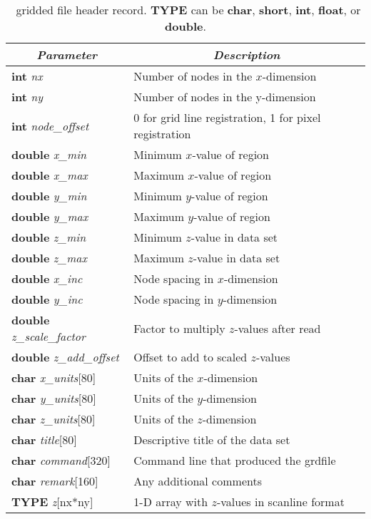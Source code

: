 \begin{table}
\centering
\begin{tabular}{|l|l|} \hline
\multicolumn{1}{|c}{\emph{Parameter}}   &       \multicolumn{1}{|c|}{\emph{Description}}        \\ \hline
\textbf{int} \emph{nx}                      &       Number of nodes in the $x$-dimension    \\ \hline
\textbf{int} \emph{ny}                      &       Number of nodes in the y-dimension      \\ \hline
\textbf{int} \emph{node\_offset}    &       0 for grid line registration, 1 for pixel registration  \\ \hline
\textbf{double} \emph{x\_min}               &       Minimum $x$-value of region     \\ \hline
\textbf{double} \emph{x\_max}               &       Maximum $x$-value of region  \\ \hline
\textbf{double} \emph{y\_min}               &       Minimum $y$-value of region  \\ \hline
\textbf{double} \emph{y\_max}               &       Maximum $y$-value of region  \\ \hline
\textbf{double} \emph{z\_min}               &       Minimum $z$-value in data set  \\ \hline
\textbf{double} \emph{z\_max}               &       Maximum $z$-value in data set  \\ \hline
\textbf{double} \emph{x\_inc}               &       Node spacing in $x$-dimension  \\ \hline
\textbf{double} \emph{y\_inc}               &       Node spacing in $y$-dimension  \\ \hline
\textbf{double} \emph{z\_scale\_factor}     &       Factor to multiply $z$-values after read  \\ \hline
\textbf{double} \emph{z\_add\_offset}       &       Offset to add to scaled $z$-values  \\ \hline
\textbf{char} \emph{x\_units}[80]   &       Units of the $x$-dimension      \\ \hline
\textbf{char} \emph{y\_units}[80]   &       Units of the $y$-dimension      \\ \hline
\textbf{char} \emph{z\_units}[80]   &       Units of the $z$-dimension      \\ \hline 
\textbf{char} \emph{title}[80]      &       Descriptive title of the data set       \\ \hline
\textbf{char} \emph{command}[320]   &       Command line that produced the grdfile  \\ \hline
\textbf{char} \emph{remark}[160]    &       Any additional comments \\ \hline \hline
\textbf{TYPE} \emph{z}[nx*ny]      &       1-D array with $z$-values in scanline format \\ \hline
\end{tabular}
\caption{\gmt\ gridded file header record. \textbf{TYPE} can be \textbf{char}, \textbf{short}, \textbf{int},
\textbf{float}, or {\bf
double}.}
\label{tbl:grdheader}
\end{table}

